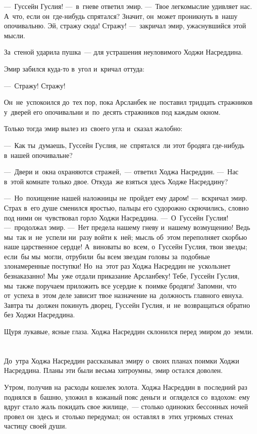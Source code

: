 \documentclass[12pt,a4paper]{book}
\begin{document}
—~Гуссейн Гуслия! —~в~гневе ответил эмир. —~Твое легкомыслие удивляет нас. А~что, если он~где-нибудь спрятался? Значит, он~может проникнуть в~нашу опочивальню. Эй, стражу сюда! Стражу! —~закричал эмир, ужаснувшийся этой мысли.

За~стеной ударила пушка~— для устрашения неуловимого Ходжи Насреддина.

Эмир забился куда-то в~угол и~кричал оттуда:

—~Стражу! Стражу!

Он~не~успокоился до~тех пор, пока Арсланбек не~поставил тридцать стражников у~дверей его опочивальни и~по~десять стражников под каждым окном.

Только тогда эмир вылез из~своего угла и~сказал жалобно:

—~Как ты~думаешь, Гуссейн Гуслия, не~спрятался~ли этот бродяга где-нибудь в~нашей опочивальне?

—~Двери и~окна охраняются стражей,~— ответил Ходжа Насреддин. —~Нас в~этой комнате только двое. Откуда~же взяться здесь Ходже Насреддину?

—~Но~похищение нашей наложницы не~пройдет ему даром! —~вскричал эмир. Страх в~его душе сменился яростью, пальцы его судорожно скрючились, словно под ними он~чувствовал горло Ходжи Насреддина. —~О~Гуссейн Гуслия! —~продолжал эмир. —~Нет предела нашему гневу и~нашему возмущению! Ведь мы~так и~не~успели ни~разу войти к~ней; мысль об~этом переполняет скорбью наше царственное сердце! А~виноваты во~всем, о~Гуссейн Гуслия, твои звезды; если~бы мы~могли, отрубили~бы всем звездам головы за~подобные злонамеренные поступки! Но~на~этот раз Ходжа Насреддин не~ускользнет безнаказанно! Мы~уже отдали приказание Арсланбеку! Тебе, Гуссейн Гуслия, мы~также поручаем приложить все усердие к~поимке бродяги! Запомни, что от~успеха в~этом деле зависит твое назначение на~должность главного евнуха. Завтра ты~должен покинуть дворец, Гуссейн Гуслия, и~не~возвращаться обратно без Ходжи Насреддина.

Щуря лукавые, ясные глаза. Ходжа Насреддин склонился перед эмиром до~земли.


\chapter{}

До~утра Ходжа Насреддин рассказывал эмиру о~своих планах поимки Ходжи Насреддина. Планы эти были весьма хитроумны, эмир остался доволен.

Утром, получив на~расходы кошелек золота. Ходжа Насреддин в~последний раз поднялся в~башню, уложил в~кожаный пояс деньги и~огляделся со~вздохом: ему вдруг стало жаль покидать свое жилище,~— столько одиноких бессонных ночей провел он~здесь и~столько передумал; он~оставлял в~этих угрюмых стенах частицу своей души.
\end{document}
